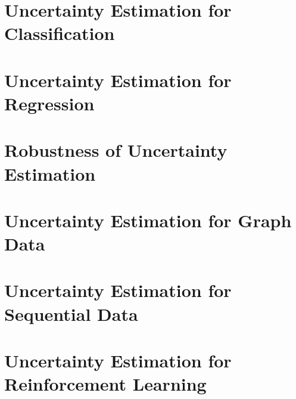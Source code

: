 \documentclass[%
]{tumDiss}
\begin{document}
\appendix

\chapter{Uncertainty Estimation for Classification}

\chapter{Uncertainty Estimation for Regression}

\chapter{Robustness of Uncertainty Estimation}

\chapter{Uncertainty Estimation for Graph Data}

\chapter{Uncertainty Estimation for Sequential Data}

\chapter{Uncertainty Estimation for Reinforcement Learning}

\end{document}

